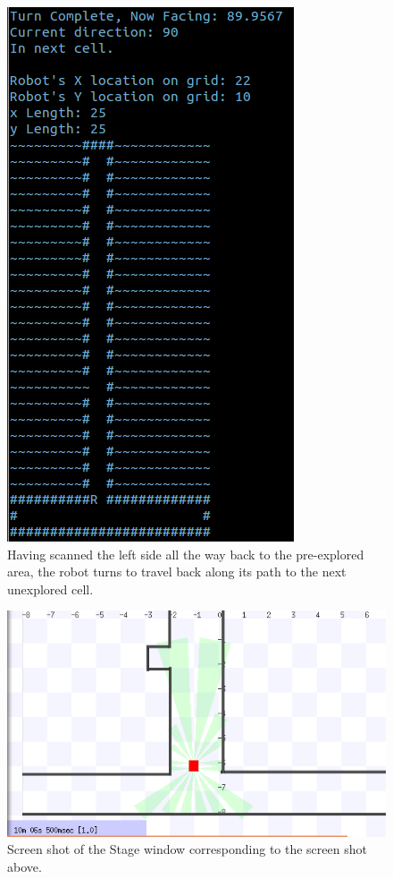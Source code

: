 \documentclass[a4paper,12pt]{article}
\begin{document}
\begin{figure}[H]
\includegraphics[scale=1.0]{RunT4.png}
\caption{Having scanned the left side all the way back to the pre-explored area, the robot turns to travel back along its path to the next unexplored cell.}
\end{figure}

\begin{figure}[H]
\includegraphics[scale=0.9]{RunS4.png}
\caption{Screen shot of the Stage window corresponding to the screen shot above.}
\end{figure}
\end{document}
